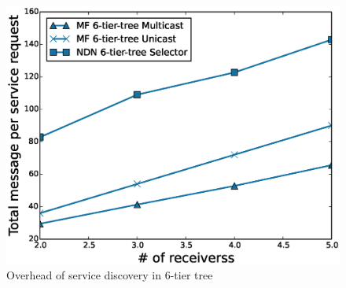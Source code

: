 \begin{figure}
\includegraphics[width=\columnwidth]{figure/6_service_discovery_overhead.eps}
\caption{\label{fig:6_service_over}Overhead of service discovery in 6-tier tree}
\end{figure}

